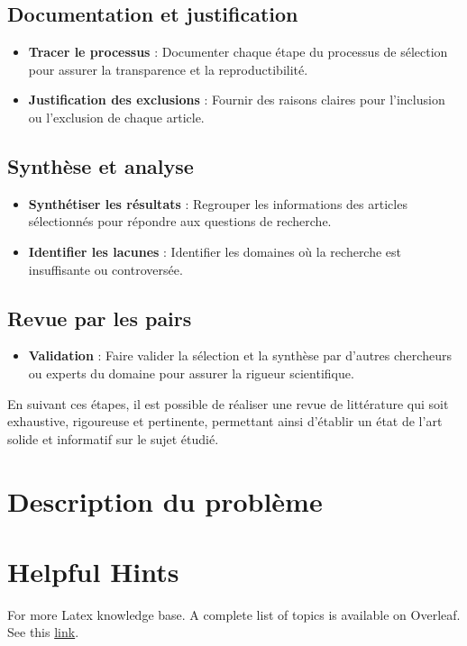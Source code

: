 \documentclass[review]{elsarticle}
\begin{document}
\subsection{Documentation et justification}
\begin{itemize}
    \item \textbf{Tracer le processus} : Documenter chaque étape du processus de sélection pour assurer la transparence et la reproductibilité.
    \item \textbf{Justification des exclusions} : Fournir des raisons claires pour l'inclusion ou l'exclusion de chaque article.
\end{itemize}

\subsection{Synthèse et analyse}
\begin{itemize}
    \item \textbf{Synthétiser les résultats} : Regrouper les informations des articles sélectionnés pour répondre aux questions de recherche.
    \item \textbf{Identifier les lacunes} : Identifier les domaines où la recherche est insuffisante ou controversée.
\end{itemize}

\subsection{Revue par les pairs}
\begin{itemize}
    \item \textbf{Validation} : Faire valider la sélection et la synthèse par d'autres chercheurs ou experts du domaine pour assurer la rigueur scientifique.
\end{itemize}

En suivant ces étapes, il est possible de réaliser une revue de littérature qui soit exhaustive, rigoureuse et pertinente, permettant ainsi d'établir un état de l'art solide et informatif sur le sujet étudié.



\section{Description du problème}\label{sec:ProbDesc}


\section{Helpful Hints}
For more Latex knowledge base. A complete list of topics is available on Overleaf. See this \href{https://www.overleaf.com/learn}{link}.
\end{document}
